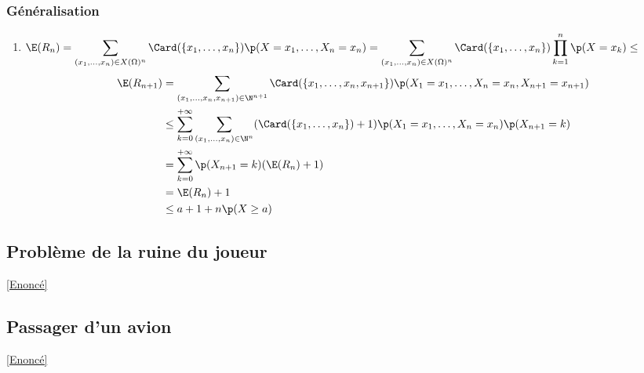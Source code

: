 \documentclass[8pt]{book}
\begin{document}
	\subsubsection{Généralisation}
	\begin{enumerate}[leftmargin=*]
		\item $\E(R_n)=\displaystyle\sum_{(x_1,\dots,x_n)\in X(\Omega)^n}\Card(\{x_1,\dots,x_n\})\p(X=x_1,\dots,X_n=x_n)=\sum_{(x_1,\dots,x_n)\in X(\Omega)^n}\Card(\{x_1,\dots,x_n\})\prod_{k=1}^n\p(X=x_k)\leq $
		\begin{align*}
			\E(R_{n+1})&=\displaystyle\sum_{(x_1,\dots,x_n,x_{n+1})\in \N^{n+1}}\Card(\{x_1,\dots,x_n,x_{n+1}\})\p(X_1=x_1,\dots,X_n=x_n,X_{n+1}=x_{n+1})\\
			&\leq \sum_{k=0}^{+\infty}\sum_{(x_1,\dots,x_n)\in \N^n}(\Card(\{x_1,\dots,x_n\})+1)\p(X_1=x_1,\dots,X_n=x_n)\p(X_{n+1}=k)\\
			&=\sum_{k=0}^{+\infty}\p(X_{n+1}=k)(\E(R_n)+1)\\
			&=\E(R_n)+1\\
			&\leq a+1+n\p(X\geq a)
		\end{align*}
		
	\end{enumerate}
	
	\subsection{Problème de la ruine du joueur}
	\label{Problème de la ruine du joueur corrigé}
	\textcolor{blue}{\hyperref[Problème de la ruine du joueur]{[Enoncé]}}\\
	
	\subsection{Passager d'un avion}
	\label{Passager d'un avion corrigé}
	\textcolor{blue}{\hyperref[Passager d'un avion]{[Enoncé]}}\\
	
\end{document}
